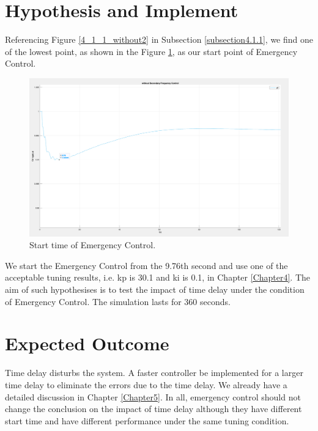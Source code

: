 \documentclass{report}
\begin{document}
\section{Hypothesis and Implement} %
Referencing Figure \textcolor{red}{\ref{4_1_1_without2}} in Subsection \textcolor{red}{\ref{subsection4.1.1}}, we find one of the lowest point, as shown in the Figure \textcolor{red}{\ref{6_2_g9}}, as our start point of Emergency Control. \\

\begin{figure}[htbp]
\centering
\includegraphics[width = .819\textwidth]{figure/6_2_g9.png}
\caption{Start time of Emergency Control.}
\label{6_2_g9}
\end{figure}

We start the Emergency Control from the 9.76th second and use one of the acceptable tuning results, i.e. kp is 30.1 and ki is 0.1, in Chapter \textcolor{red}{\ref{Chapter4}}. The aim of such hypothesises is to test the impact of time delay under the condition of Emergency Control. The simulation lasts for 360 seconds.\\



\section{Expected Outcome} %
Time delay disturbs the system. A faster controller be implemented for a larger time delay to eliminate the errors due to the time delay. We already have a detailed discussion in Chapter \textcolor{red}{\ref{Chapter5}}. In all, emergency control should not change the conclusion on the impact of time delay although they have different start time and have different performance under the same tuning condition.\\
\end{document}
